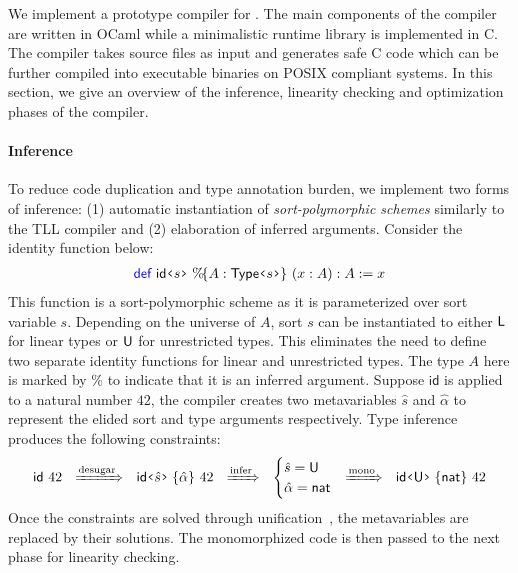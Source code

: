 We implement a prototype compiler for \TLLC{}. The main components of the compiler
are written in OCaml while a minimalistic runtime library is implemented in C.
The compiler takes \TLLC{} source files as input and generates safe C code which
can be further compiled into executable binaries on POSIX compliant systems.
In this section, we give an overview of the inference, linearity checking
and optimization phases of the compiler.

\paragraph{\textbf{Inference}}
To reduce code duplication and type annotation burden, we implement two forms of inference: 
(1) automatic instantiation of \emph{sort-polymorphic schemes} similarly to the TLL compiler and 
(2) elaboration of inferred arguments.
Consider the identity function below:
\begin{align*}
  \Def\ \textsf{id}\flq{s}\frq\ \%\!\{ A : \textsf{Type}\flq{s}\frq\}\ (x : A) : A := x
\end{align*}
This function is a sort-polymorphic scheme as it is parameterized over sort variable $s$.
Depending on the universe of $A$, sort $s$ can be instantiated to either $\textsf{L}$ for linear types
or $\textsf{U}$ for unrestricted types. This eliminates the need to define two separate identity functions
for linear and unrestricted types. The type $A$ here is marked by $\%$ to indicate that it is an
inferred argument. Suppose $\textsf{id}$ is applied to a natural number $42$, the compiler creates
two metavariables $\hat{s}$ and $\hat{\alpha}$ to represent the elided sort and type arguments respectively.
Type inference produces the following constraints:
\begin{align*}
  \textsf{id}\ 42 
  \ \ 
  \xRightarrow{\text{desugar}} 
  \ \ 
  \appI{\textsf{id}\flq{\hat{s}}\frq}{\hat{\alpha}}\ 42
  \ \ 
  \xRightarrow{\text{infer}} 
  \ \ 
  \begin{cases}
    \hat{s} = \Un \\
    \hat{\alpha} = \textsf{nat}
  \end{cases}
  \!\!
  \xRightarrow{\text{mono}} 
  \ \ 
  \appI{\textsf{id}\flq{\Un}\frq}{\textsf{nat}}\ 42
\end{align*}
Once the constraints are solved through unification~\cite{abel11}, the metavariables are
replaced by their solutions. The monomorphized code is then passed to the next phase for
linearity checking.


